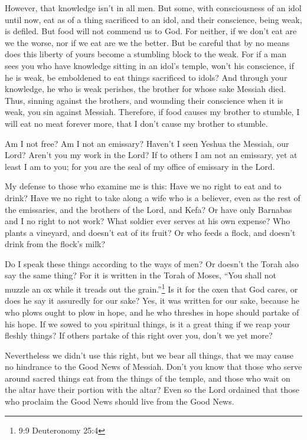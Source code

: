 \myverse{}However, that knowledge isn’t in all men. But some, with consciousness
of an idol until now, eat as of a thing sacrificed to an idol, and their conscience, being weak, is defiled.
\myverse{}But food will not commend us to God. For neither, if we don’t eat are we the
worse, nor if we eat are we the better.
\myverse{}But be careful that by no means does this liberty of yours become a stumbling
block to the weak.
\myverse{}For if a man sees you who have knowledge sitting in an idol’s temple, won’t
his conscience, if he is weak, be emboldened to eat things sacrificed to idols?
\myverse{}And through your knowledge, he who is weak perishes, the brother for whose
sake Messiah died.
\myverse{}Thus, sinning against the brothers, and wounding their conscience when it
is weak, you sin against Messiah.
\myverse{}Therefore, if food causes my brother to stumble, I will eat no meat forever
more, that I don’t cause my brother to stumble.


\mychapter{} \myverse*{}Am I not free? Am I not an emissary? Haven’t I seen Yeshua the Messiah,
our Lord? Aren’t you my work in the Lord?
\myverse{}If to others I am not an emissary, yet at least I am to you; for you are the
seal of my office of emissary in the Lord.

\myverse{}My defense to those who examine me is this:
\myverse{}Have we no right to eat and to drink?
\myverse{}Have we no right to take along a wife who is a believer, even as the rest of
the emissaries, and the brothers of the Lord, and Kefa?
\myverse{}Or have only Barnabas and I no right to not work?
\myverse{}What soldier ever serves at his own expense? Who plants a vineyard, and doesn’t
eat of its fruit? Or who feeds a flock, and doesn’t drink from the flock’s milk?

\myverse{}Do I speak these things according to the ways of men? Or doesn’t
the Torah also say the same thing?
\myverse{}For it is written in the Torah of Moses, “You shall not muzzle an ox while it
treads out the grain.”\footnote{9:9 Deuteronomy 25:4} Is it for the oxen that God cares,
\myverse{}or does he say it assuredly for our sake? Yes, it was written for our sake,
because he who plows ought to plow in hope, and he who threshes in hope should partake of his hope.
\myverse{}If we sowed to you spiritual things, is it a great thing if we reap your fleshly
things?
\myverse{}If others partake of this right over you, don’t we yet more?

Nevertheless we didn’t use this right, but we bear all things, that we may cause no hindrance
to the Good News of Messiah.
\myverse{}Don’t you know that those who serve around sacred things eat from the things
of the temple, and those who wait on the altar have their portion with the altar?
\myverse{}Even so the Lord ordained that those who proclaim the Good News should live
from the Good News.

